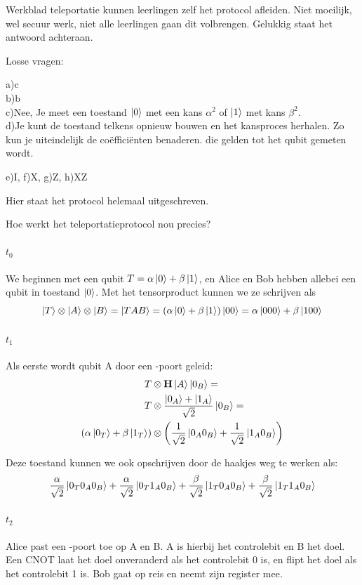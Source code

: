 \documentclass[../../main.tex]{subfiles}
\begin{document}
Werkblad teleportatie kunnen leerlingen zelf het protocol afleiden. Niet moeilijk, wel secuur werk, niet alle leerlingen gaan dit volbrengen. Gelukkig staat het antwoord achteraan.

Losse vragen:

a)c\\
b)b\\
c)Nee, Je meet een toestand $\ket{0}$ met een kans $\alpha^2$ of $\ket{1}$ met kans $\beta^2$.\\
d)Je kunt de toestand telkens opnieuw bouwen en het kansproces herhalen. Zo kun je uiteindelijk de co\"effici\"enten benaderen. die gelden tot het qubit gemeten wordt.

e)I, f)X, g)Z, h)XZ

Hier staat het protocol helemaal uitgeschreven.



Hoe werkt het teleportatieprotocol nou precies?

\paragraph*{$t_0$} We beginnen met een qubit $T=\alpha\ket{0}+\beta\ket{1}$, en Alice en Bob hebben allebei een qubit in toestand $\ket{0}$. Met het tensorproduct kunnen we ze schrijven als
\[\ket{T}\otimes\ket{A}\otimes\ket{B}=\ket{TAB} = \left(\alpha\ket{0}+\beta\ket{1}\right)\ket{00}= \alpha\ket{000}+\beta\ket{100}\]
\paragraph*{$t_1$} Als eerste wordt qubit A door een -poort geleid:
\[\begin{aligned}
T &\otimes \port{H}\ket{A}\ket{0_B} =\\
T &\otimes \frac{\ket{0_A}+\ket{1_A}}{\sqrt{2}}\ket{0_B} =\\
\left(\alpha\ket{0_T}+\beta\ket{1_T}\right) &\otimes \left(\frac{1}{\sqrt{2}}\ket{0_A0_B}+\frac{1}{\sqrt{2}}\ket{1_A0_B}\right)
\end{aligned}\]

Deze toestand kunnen we ook opschrijven door de haakjes weg te werken als:
\[\begin{aligned}
\frac{\alpha}{\sqrt{2}}\ket{0_T0_A0_B} +
\frac{\alpha}{\sqrt{2}}\ket{0_T1_A0_B} +
\frac{\beta}{\sqrt{2}}\ket{1_T0_A0_B} +
\frac{\beta}{\sqrt{2}}\ket{1_T1_A0_B}
\end{aligned}\]

\paragraph*{$t_2$} Alice past een -poort toe op A en B. A is hierbij het controlebit en B het doel. Een CNOT laat het doel onveranderd als het controlebit 0 is, en flipt het doel als het controlebit 1 is. Bob gaat op reis en neemt zijn register mee.
\end{document}
